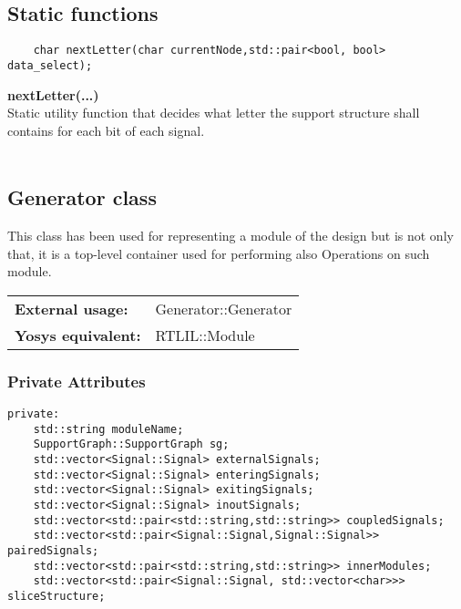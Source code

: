 \documentclass{article}
\begin{document}
\subsection{Static functions}

\begin{mdframed}[hidealllines=true, backgroundcolor=green!10]
	\begin{lstlisting}
	char nextLetter(char currentNode,std::pair<bool, bool> data_select);
	\end{lstlisting}
\end{mdframed}

\textbf{nextLetter(...)}\\
Static utility function that decides what letter the support structure shall contains for each bit of each signal.\\\\

\subsection{Generator class}

This class has been used for representing a module of the design but is not only that, it is a top-level container used for performing also
Operations on such module.\\

\begin{tabular}{ll}
	\textbf{External usage: } & Generator::Generator\\
	\textbf{Yosys equivalent: } & RTLIL::Module\\
\end{tabular}

\subsubsection{Private Attributes}

\begin{mdframed}[hidealllines=true, backgroundcolor=magenta!10]
	\begin{lstlisting}[basicstyle=\tiny]
	private:
	std::string moduleName;
	SupportGraph::SupportGraph sg;
	std::vector<Signal::Signal> externalSignals;
	std::vector<Signal::Signal> enteringSignals;
	std::vector<Signal::Signal> exitingSignals;
	std::vector<Signal::Signal> inoutSignals;
	std::vector<std::pair<std::string,std::string>> coupledSignals;
	std::vector<std::pair<Signal::Signal,Signal::Signal>> pairedSignals;
	std::vector<std::pair<std::string,std::string>> innerModules;
	std::vector<std::pair<Signal::Signal, std::vector<char>>> sliceStructure;
	\end{lstlisting}
\end{mdframed}
\end{document}
